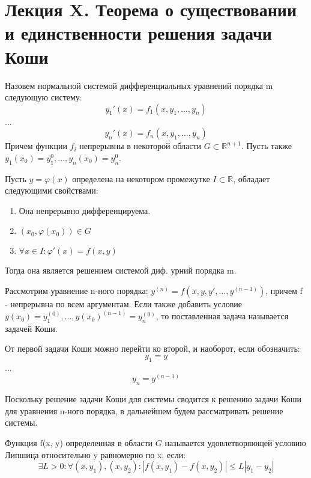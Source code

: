 \documentclass[document.tex]{subfiles}
\begin{document}
\section*{Лекция X. Теорема о существовании и единственности решения задачи Коши}
\begin{definition}
Назовем нормальной системой дифференциальных уравнений порядка m следующую систему:
$$y_1'(x) = f_1(x, y_1, \ldots, y_n)$$
...
$$y_n'(x) = f_n(x, y_1, \ldots, y_n)$$
Причем функции $f_i$ непрерывны в некоторой области $G \subset \mathbb{R}^{n+1}$. Пусть также $y_1(x_0) = y_1^0, \ldots, y_n(x_0) = y_n^0$.
\end{definition}

\begin{definition}
Пусть $y = \varphi(x)$ определена на некотором промежутке $I \subset \mathbb{R}$, обладает следующими свойствами:
\begin{enumerate}
\item Она непрерывно дифференцируема.
\item $(x_0, \varphi(x_0)) \in G$
\item $\forall x \in I: \varphi'(x) = f(x, y)$
\end{enumerate}
Тогда она является решением системой диф. урний порядка m.
\end{definition}

\begin{Example}
Рассмотрим уравнение n-ного порядка:
$y^{(n)} = f(x, y, y', \ldots, y^{(n-1)})$, причем f - непрерывна по всем аргументам.
Если также добавить условие $y(x_0) = y_1^{(0)}, \ldots, y(x_0)^{(n-1)} = y_n^{(0)}$, то поставленная задача называется задачей Коши.
\end{Example}

\begin{Remark}
От первой задачи Коши можно перейти ко второй, и наоборот, если обозначить:
$$y_1 = y$$
...
$$y_n = y^{(n-1)}$$
\end{Remark}

\begin{Remark}
Поскольку решение задачи Коши для системы сводится к решению задачи Коши для уравнения n-ного порядка, в дальнейшем будем рассматривать решение системы.
\end{Remark}

\begin{Definition}
Функция f(x, y) определенная в области $G$ называется удовлетворяющей условию Липшица относительно y равномерно по x, если:
$$\exists L > 0 : \forall (x, y_1), (x, y_2): |f(x, y_1) - f(x, y_2)| \leq L |y_1 - y_2|$$
\end{Definition}
\end{document}
